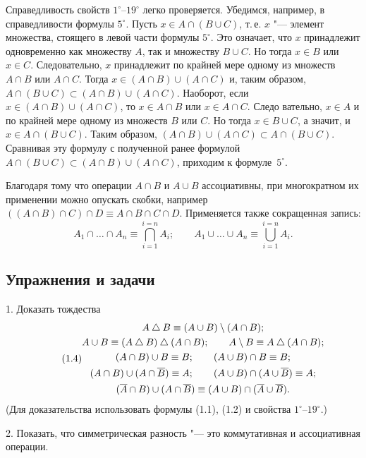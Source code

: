 Справедливость свойств $1^\circ$--$19^\circ$ легко проверяется. Убедимся,
например, в справедливости формулы $5^\circ$. Пусть
$x\in A\cap(B\cup C)$, т.\,е. $x$ "--- элемент множества, стоящего в левой
части формулы $5^\circ$. Это означает, что $x$ принадлежит одновременно как
множеству $A$, так и множеству $B\cup C$. Но тогда $x\in B$ или $x\in C$.
Следовательно, $x$ принадлежит по крайней мере одному из множеств
$A\cap B$ или $A\cap C$. Тогда $x\in(A\cap B)\cup(A\cap C)$ и, таким
образом, $A\cap(B\cup C)\subset(A\cap B)\cup(A\cap C)$. Наоборот, если
$x\in(A\cap B)\cup(A\cap C)$, то $x\in A\cap B$ или $x\in A\cap C$.
Следо\-%
%
вательно, $x\in A$ и по крайней мере одному из множеств $B$ или $C$. Но
тогда $x\in B\cup C$, а значит, и $x\in A\cap(B\cup C)$. Таким образом,
$(A\cap B)\cup(A\cap C)\subset A\cap(B\cup C)$. Сравнивая эту формулу
с полученной ранее формулой $A\cap(B\cup C)\subset(A\cap B)\cup(A\cap C)$,
приходим к формуле~$5^\circ$.

Благодаря тому что операции $A\cap B$ и $A\cup B$ ассоциативны, при
многократном их применении можно опускать скобки, например
$((A\cap B)\cap C)\cap D\equiv A\cap B\cap C\cap D$. Применяется также
сокращенная запись:
\begin{equation}\tag{1.3}
A_1\cap\dots\cap A_n\equiv\bigcap_{i=1}^{i=n}A_i;\qquad
A_1\cup\dots\cup A_n\equiv\bigcup_{i=1}^{i=n}A_i.
\end{equation}

\subsection*{Упражнения и задачи}
\label{ex:s1}
1. Доказать тождества
\begin{equation}\tag{1.4}
\begin{gathered}
A\mathbin{\triangle} B\equiv(A\cup B)\setminus(A\cap B);\\
A\cup B\equiv(A\mathbin{\triangle} B)\mathbin{\triangle}(A\cap B);\qquad A\setminus B\equiv A\mathbin{\triangle}(A\cap B);\\
(A\cap B)\cup B\equiv B;\qquad (A\cup B)\cap B\equiv B;\\
(A\cap B)\cup(A\cap\overline{B})\equiv A;\qquad (A\cup B)\cap(A\cup\overline{B})\equiv A;\\
(\overline{A}\cap B)\cup(A\cap\overline{B})\equiv(A\cup B)\cap(\overline{A}\cup\overline{B}).
\end{gathered}
\end{equation}
(Для доказательства использовать формулы (1.1), (1.2) и свойства
$1^\circ$--$19^\circ$.)

2. Показать, что симметрическая разность "--- это коммутативная
и ассоциативная операции.


